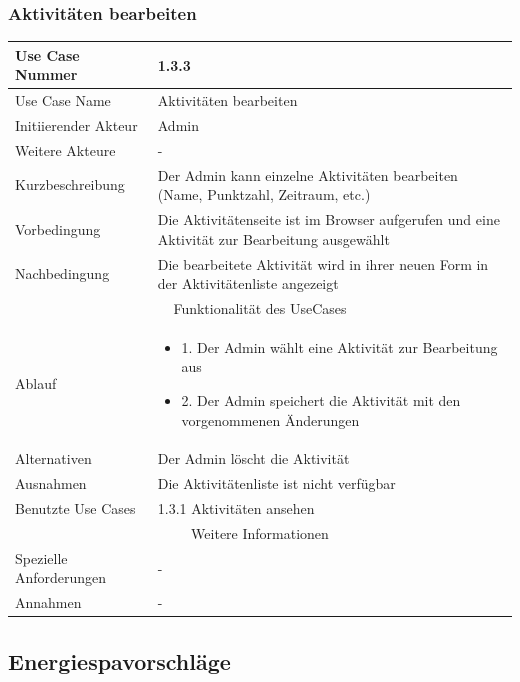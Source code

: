 \documentclass[10pt,a4paper]{article}
\begin{document}
	\subsubsection{Aktivit\"aten bearbeiten}
	\begin{tabular}{|l|p{.5\linewidth}|}
	\hline Use Case Nummer & 1.3.3 \\ 
	\hline Use Case Name & Aktivit\"aten bearbeiten \\ 
	\hline Initiierender Akteur & Admin \\
	\hline Weitere Akteure & - \\
	\hline Kurzbeschreibung & Der Admin kann einzelne Aktivit\"aten bearbeiten (Name, Punktzahl, Zeitraum, etc.) \\
	\hline Vorbedingung & Die Aktivit\"atenseite ist im Browser aufgerufen und eine Aktivit\"at zur Bearbeitung ausgew\"ahlt \\
	\hline Nachbedingung & Die bearbeitete Aktivit\"at wird in ihrer neuen Form in der Aktivit\"atenliste angezeigt \\
	\hline \multicolumn{2}{|c|}{Funktionalität des UseCases}\\
	\hline Ablauf & \begin{itemize}
			\item 1. Der Admin w\"ahlt eine Aktivit\"at zur Bearbeitung aus
			\item 2. Der Admin speichert die Aktivit\"at mit den vorgenommenen \"Anderungen
		\end{itemize} \\
	\hline Alternativen & Der Admin l\"oscht die Aktivit\"at \\
	\hline Ausnahmen & Die Aktivit\"atenliste ist nicht verf\"ugbar \\
	\hline Benutzte Use Cases & 1.3.1 Aktivit\"aten ansehen \\
	\hline \multicolumn{2}{|c|}{Weitere Informationen} \\
	\hline Spezielle Anforderungen & - \\
	\hline Annahmen & - \\
	\hline
	\end{tabular} 
\subsection{Energiespavorschl\"age}
\end{document}
